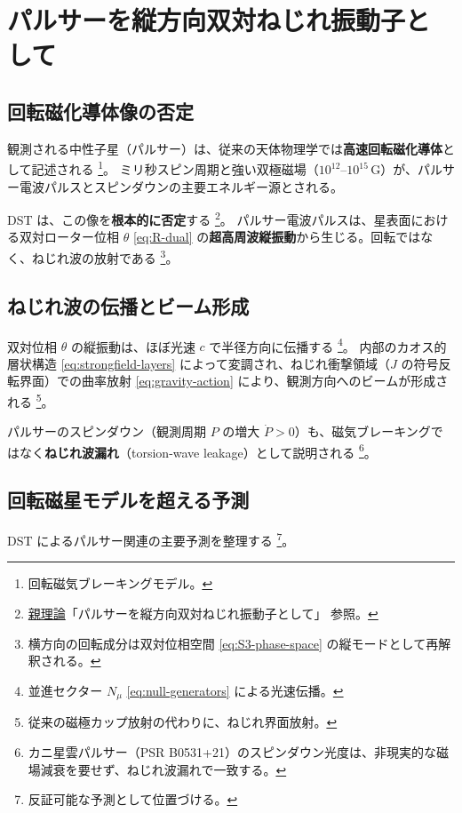 \documentclass[dvipdfmx,a4paper,oneside]{jsbook}
\numberwithin{equation}{chapter}
\begin{document}
\section{パルサーを縦方向双対ねじれ振動子として}

\subsection{回転磁化導体像の否定}

観測される中性子星（パルサー）は、従来の天体物理学では\textbf{高速回転磁化導体}として記述される \footnote{回転磁気ブレーキングモデル。}。
ミリ秒スピン周期と強い双極磁場（\(10^{12}\)–\(10^{15}\,\mathrm{G}\)）が、パルサー電波パルスとスピンダウンの主要エネルギー源とされる。

DST は、この像を\textbf{根本的に否定}する \footnote{\hyperref[sec:sister-manuscripts]{親理論}「パルサーを縦方向双対ねじれ振動子として」 参照。}。
パルサー電波パルスは、星表面における双対ローター位相 \(\theta\) \eqref{eq:R-dual} の\textbf{超高周波縦振動}から生じる。回転ではなく、ねじれ波の放射である \footnote{横方向の回転成分は双対位相空間 \eqref{eq:S3-phase-space} の縦モードとして再解釈される。}。

\subsection{ねじれ波の伝播とビーム形成}

双対位相 \(\theta\) の縦振動は、ほぼ光速 \(c\) で半径方向に伝播する \footnote{並進セクター \(N_\mu\) \eqref{eq:null-generators} による光速伝播。}。
内部のカオス的層状構造 \eqref{eq:strongfield-layers} によって変調され、ねじれ衝撃領域（\(J\) の符号反転界面）での曲率放射 \eqref{eq:gravity-action} により、観測方向へのビームが形成される \footnote{従来の磁極カップ放射の代わりに、ねじれ界面放射。}。

パルサーのスピンダウン（観測周期 \(P\) の増大 \(\dot{P} > 0\)）も、磁気ブレーキングではなく\textbf{ねじれ波漏れ}（torsion-wave leakage）として説明される \footnote{カニ星雲パルサー（PSR B0531+21）のスピンダウン光度は、非現実的な磁場減衰を要せず、ねじれ波漏れで一致する。}。

\subsection{回転磁星モデルを超える予測}

DST によるパルサー関連の主要予測を整理する \footnote{反証可能な予測として位置づける。}。
\end{document}
